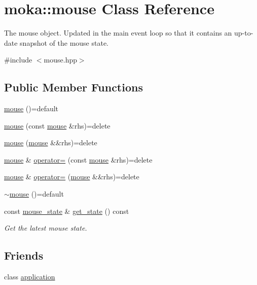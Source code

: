 \hypertarget{classmoka_1_1mouse}{}\section{moka\+::mouse Class Reference}
\label{classmoka_1_1mouse}


The mouse object. Updated in the main event loop so that it contains an up-\/to-\/date snapshot of the mouse state.  




{\ttfamily \#include $<$mouse.\+hpp$>$}

\subsection*{Public Member Functions}
\begin{DoxyCompactItemize}
\item 
\mbox{\hyperlink{classmoka_1_1mouse_aeaf835849e5053f0f90ef725d99d4781}{mouse}} ()=default
\item 
\mbox{\hyperlink{classmoka_1_1mouse_a0928a60ff721056d5e86d0ef84fdb6ff}{mouse}} (const \mbox{\hyperlink{classmoka_1_1mouse}{mouse}} \&rhs)=delete
\item 
\mbox{\hyperlink{classmoka_1_1mouse_af267ff2c984d9cc478341e9e5b42152f}{mouse}} (\mbox{\hyperlink{classmoka_1_1mouse}{mouse}} \&\&rhs)=delete
\item 
\mbox{\hyperlink{classmoka_1_1mouse}{mouse}} \& \mbox{\hyperlink{classmoka_1_1mouse_a500f0cd4e101507fe975b63473483bc2}{operator=}} (const \mbox{\hyperlink{classmoka_1_1mouse}{mouse}} \&rhs)=delete
\item 
\mbox{\hyperlink{classmoka_1_1mouse}{mouse}} \& \mbox{\hyperlink{classmoka_1_1mouse_a56e7cf8f2708615ed4727fc126faf1cd}{operator=}} (\mbox{\hyperlink{classmoka_1_1mouse}{mouse}} \&\&rhs)=delete
\item 
\mbox{\hyperlink{classmoka_1_1mouse_a0bd250ae71a723879ee92f3bd5a20679}{$\sim$mouse}} ()=default
\item 
const \mbox{\hyperlink{classmoka_1_1mouse__state}{mouse\+\_\+state}} \& \mbox{\hyperlink{classmoka_1_1mouse_a84b5c0f69d38f4cecbdb83ee79bded51}{get\+\_\+state}} () const
\begin{DoxyCompactList}\small\item\em Get the latest mouse state. \end{DoxyCompactList}\end{DoxyCompactItemize}
\subsection*{Friends}
\begin{DoxyCompactItemize}
\item 
class \mbox{\hyperlink{classmoka_1_1mouse_a5b97104505447c42689b96b15027d832}{application}}
\end{DoxyCompactItemize}


